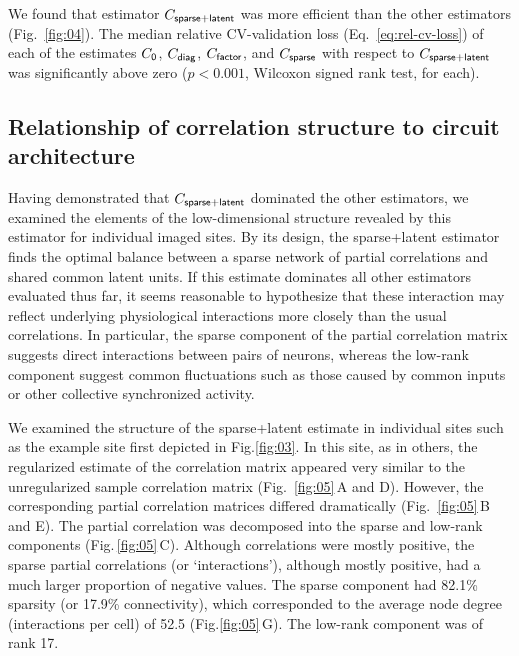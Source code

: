 \documentclass[10pt]{article}
\begin{document}
We found that estimator $C_{\sf sparse+latent}$ was more efficient than the other estimators (Fig.~\ref{fig:04}). The median relative CV-validation loss (Eq.~\ref{eq:rel-cv-loss}) of each of the estimates $C_{\sf 0}$, $C_{\sf diag}$, $C_{\sf factor}$, and $C_{\sf sparse}$ with respect to $C_{\sf sparse+latent}$ was significantly above zero ($p<0.001$, Wilcoxon signed rank test, for each).

\subsection*{Relationship of correlation structure to circuit architecture}
Having demonstrated that $C_{\sf sparse+latent}$ dominated the other estimators, we examined the elements of the low-dimensional structure revealed by this estimator for individual imaged sites. By its design, the sparse+latent estimator finds the optimal balance between a sparse network of partial correlations and shared common latent units. If this estimate dominates all other estimators evaluated thus far, it seems reasonable to hypothesize that these interaction may reflect underlying physiological interactions more closely than the usual correlations. In particular, the sparse component of the partial correlation matrix suggests direct interactions between pairs of neurons, whereas the low-rank component suggest common fluctuations such as those caused by common inputs or other collective synchronized activity. 

We examined the structure of the sparse+latent estimate in individual sites such as the example site first depicted in Fig.\;\ref{fig:03}. In this site, as in others, the regularized estimate of the correlation matrix appeared very similar to the unregularized sample correlation matrix (Fig.~\ref{fig:05}\,A and D). However, the corresponding partial correlation matrices differed dramatically (Fig.~\ref{fig:05}\,B and E). The partial correlation was decomposed into the sparse and low-rank components (Fig.\,\ref{fig:05}\,C). Although correlations were mostly positive, the sparse partial correlations (or `interactions'), although mostly positive, had a much larger proportion of negative values. The sparse component had 82.1\% sparsity (or 17.9\% connectivity), which corresponded to the average node degree (interactions per cell) of 52.5 (Fig.\;\ref{fig:05}\,G). The low-rank component was of rank 17.
\end{document}
